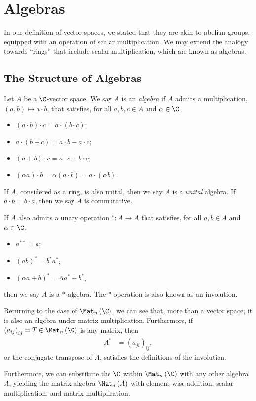 \section{Algebras}%
In our definition of vector spaces, we stated that they are akin to abelian groups, equipped with an operation of scalar multiplication. We may extend the analogy towards ``rings'' that include scalar multiplication, which are known as algebras.
\subsection{The Structure of Algebras}%
\begin{definition}\label{def:algebra_star_algebra}
  Let $A$ be a $\C$-vector space. We say $A$ is an \textit{algebra} if $A$ admits a multiplication, $\left(a,b\right)\mapsto a\cdot b$, that satisfies, for all $a,b,c\in A$ and $\alpha \in \C$,
  \begin{itemize}
    \item $\left(a\cdot b\right)\cdot c = a\cdot \left(b\cdot c\right)$;
    \item $a\cdot \left(b+c\right) = a\cdot b + a\cdot c$;
    \item $\left(a+b\right)\cdot c = a\cdot c + b\cdot c$;
    \item $\left(\alpha a\right)\cdot b = \alpha \left(a\cdot b\right) = a \cdot \left(\alpha b\right)$.
  \end{itemize}
  If $A$, considered as a ring, is also unital, then we say $A$ is a \textit{unital} algebra. If $a\cdot b = b\cdot a$, then we say $A$ is commutative.\newline

  If $A$ also admits a unary operation $\ast\colon A\rightarrow A$ that satisfies, for all $a,b\in A$ and $\alpha \in \C$,
  \begin{itemize}
    \item $a^{\ast\ast} = a$;
    \item $\left(ab\right)^{\ast} = b^{\ast}a^{\ast}$;
    \item $\left(\alpha a + b\right)^{\ast} = \overline{\alpha}a^{\ast} + b^{\ast}$,
  \end{itemize}
  then we say $A$ is a $\ast$-algebra. The $\ast$ operation is also known as an involution.
\end{definition}
\begin{example}\label{ex:matrix_algebra}
  Returning to the case of $\Mat_n\left( \C \right)$, we can see that, more than a vector space, it is also an algebra under matrix multiplication. Furthermore, if $\left( a_{ij} \right)_{ij} = T\in \Mat_n\left( \C \right)$ is any matrix, then
  \begin{align*}
    A^{\ast} &= \left( \overline{a_{ji}} \right)_{ij},
  \end{align*}
  or the conjugate transpose of $A$, satisfies the definitions of the involution.\newline

  Furthermore, we can substitute the $\C$ within $\Mat_n\left( \C \right)$ with any other algebra $A$, yielding the matrix algebra $\Mat_n\left( A \right)$ with element-wise addition, scalar multiplication, and matrix multiplication.
\end{example}
